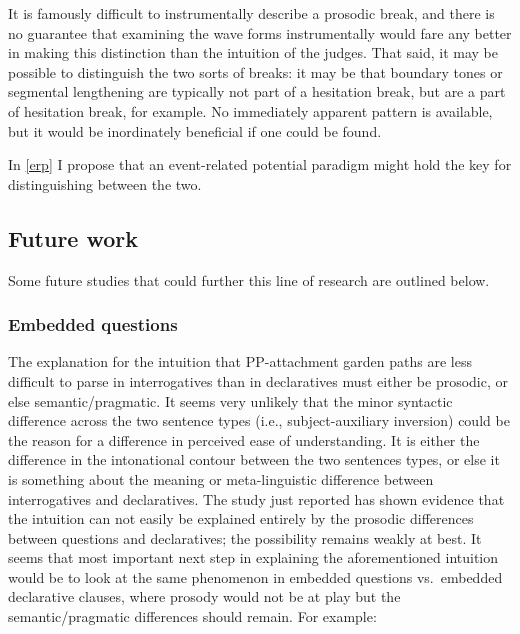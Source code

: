 \documentclass[12pt,oneside]{book}
\begin{document}
It is famously difficult to instrumentally describe a prosodic break, and there is no guarantee that examining the wave forms instrumentally would fare any better in making this distinction than the intuition of the judges. That said, it may be possible to distinguish the two sorts of breaks: it may be that boundary tones or segmental lengthening are typically not part of a hesitation break, but are a part of hesitation break, for example. No immediately apparent pattern is available, but it would be inordinately beneficial if one could be found.

In \ref{erp} I propose that an event-related potential paradigm might hold the key for distinguishing between the two.

\hypertarget{future-work}{%
\subsection{Future work}\label{future-work}}

Some future studies that could further this line of research are outlined below.

\hypertarget{embedded-questions}{%
\subsubsection{Embedded questions}\label{embedded-questions}}

The explanation for the intuition that PP-attachment garden paths are less difficult to parse in interrogatives than in declaratives must either be prosodic, or else semantic/pragmatic. It seems very unlikely that the minor syntactic difference across the two sentence types (i.e., subject-auxiliary inversion) could be the reason for a difference in perceived ease of understanding. It is either the difference in the intonational contour between the two sentences types, or else it is something about the meaning or meta-linguistic difference between interrogatives and declaratives. The study just reported has shown evidence that the intuition can not easily be explained entirely by the prosodic differences between questions and declaratives; the possibility remains weakly at best. It seems that most important next step in explaining the aforementioned intuition would be to look at the same phenomenon in embedded questions vs.~embedded declarative clauses, where prosody would not be at play but the semantic/pragmatic differences should remain. For example:
\end{document}
